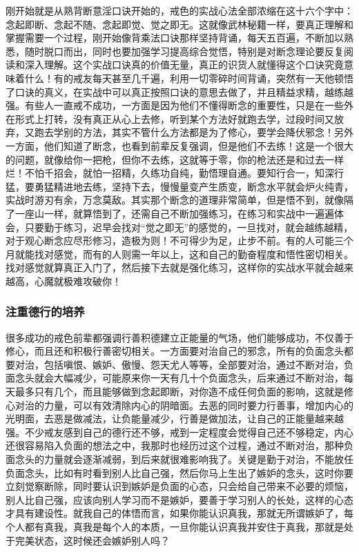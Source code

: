 刚开始就是从熟背断意淫口诀开始的，戒色的实战心法全部浓缩在这十六个字中：念起即断、念起不随、念起即觉、觉之即无。这就像武林秘籍一样，要真正理解和掌握需要一个过程，刚开始像背乘法口诀那样坚持背诵，每天五百遍，不断加以熟悉，随时脱口而出，同时也要加强学习提高综合觉悟，特别是对断念理论要反复阅读和深入理解。这个实战口诀真的价值无量，真正的识货人就懂得这个口诀究竟意味着什么！有的戒友每天甚至几千遍，利用一切零碎时间背诵，突然有一天他顿悟了口诀的真义，在实战中可以真正按照口诀的意思去做了，并且精益求精，越练越强。有些人一直戒不成功，一方面是因为他们不懂得断念的重要性，只是在一些外在形式上打转，没有真正从心上去修，听到某个方法好就跑去学，过段时间又放弃，又跑去学别的方法，其实不管什么方法都是为了修心，要学会降伏邪念！另外一方面，他们知道了断念，也看到前辈反复强调，但是他们不去练！这是一个很大的问题，就像给你一把枪，但你不去练，这就等于零，你的枪法还是和过去一样烂！不怕千招会，就怕一招精，久练功自纯，勤悟理自通。要知行合一，知深行猛，要勇猛精进地去练，坚持下去，慢慢量变产生质变，断念水平就会炉火纯青，实战时游刃有余，万念莫敌。其实那个断念的道理非常简单，但是悟不到，就像隔了一座山一样，就算悟到了，还需自己不断加强练习，在练习和实战中一遍遍体会，只要勤于练习，迟早会找对“觉之即无”的感觉的，一旦找对，就会越练越精，对于观心断念应尽形修习，造极为则！不可得少为足，止步不前。有的人可能三个月就能找对感觉，而有的人则需一年以上，这和自己的勤奋程度和悟性密切相关。找对感觉就算真正入门了，然后接下去就是强化练习，这样你的实战水平就会越来越高，心魔就极难攻破你！

\subsubsection{注重德行的培养}

很多成功的戒色前辈都强调行善积德建立正能量的气场，他们能够成功，不仅善于修心，而且还和积极行善密切相关。一方面要对治自己的邪念，所有的负面念头都要对治，包括嗔恨、嫉妒、傲慢、怨天尤人等等，全部要对治，通过不断对治，负面念头就会大幅减少，可能原来你一天有几十个负面念头，后来通过不断对治，每天最多只有几个，而且能够做到念起即断，对你造不成任何负面的影响，这就是修心对治的力量，可以有效清除内心的阴暗面。去恶的同时要力行善事，增加内心的光明面，去恶是做减法，让负能量减少，行善是做加法，让自己的正能量越来越强。不少戒友感到自己的德行还不够，戒到一定程度会觉得自己还不够稳定，内心还很容易陷入负面的想法之中，我那时也经历过这个过程，通过不断对治，那种负面念头的力量就会逐渐减弱，到后来就很难影响我了。关键是勤于对治，不能放任负面念头，比如有时看到别人比自己强，然后你马上生出了嫉妒的念头，这时你要立刻觉察断除，同时要认识到嫉妒是负面的心态，只会给自己带来不必要的烦恼，别人比自己强，应该向别人学习而不是嫉妒，要善于学习别人的长处，这样的心态才具有建设性。就我自己的体悟而言，如果你能认识真我，那就无所谓嫉妒了，每个人都有真我，真我是每个人的本质，一旦你能认识真我并安住于真我，那就是处于完美状态，这时候还会嫉妒别人吗？

